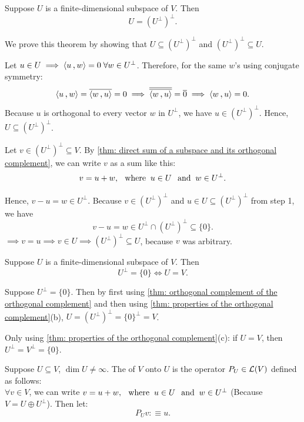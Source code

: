 \begin{thm}
  \label{thm: orthogonal complement of the orthogonal complement}
  Suppose $U$ is a finite-dimensional subspace of $V$. Then
  \[
    U = (U^{\bot})^{\bot}.
  \]
\end{thm}
\begin{prf}
  We prove this theorem by showing that $U \subseteq (U^{\bot})^{\bot}$ and $ (U^{\bot})^{\bot} \subseteq U$.

   Let $u \in U \implies \ip{u}{w}=0 \; \forall w \in U^{\bot}$.
  Therefore, for the same $w$'s using conjugate symmetry:
  \[
    \ip{u}{w}=\overline{\ip{w}{u}} =0 \implies
    \overline{\overline{\ip{w}{u}}} =\overline{0} \implies
    \ip{w}{u} = 0.
  \]
  Because $u$ is orthogonal to every vector
  $w$ in $U^{\bot}$, we have $u \in (U^{\bot})^{\bot}$. Hence, $U \subseteq (U^{\bot})^{\bot}$.

   Let $v \in (U^{\bot})^{\bot} \subseteq V.$ By \ref{thm: direct sum of a subspace and its orthogonal complement}, we can write $v$ as a sum like this:
  \[
    v = u + w, \;\;\, \text{where}\;\; u \in U \;\;\, \text{and}\;\; w \in U^{\bot}.
  \]

  Hence, $v-u=w \in U^\bot$. Because
  $v \in (U^\bot)^\bot$ and $u \in U \subseteq (U^\bot)^\bot$ from step 1, we have
  \[
    v-u=w \in U^\bot \cap (U^\bot)^\bot \subseteq \{0\}.
  \]
  $\implies v=u \implies v \in U \implies (U^\bot)^\bot \subseteq U$, because $v$ was arbitrary.
\end{prf}

\begin{thm}
  Suppose $U$ is a finite-dimensional subspace of $V$. Then
  \begin{equation}
    U^\bot = \{0\} \iff U=V.
  \end{equation}
\end{thm}
\begin{prf}
  \Rightarrowdirection Suppose $U^\bot=\{0\}.$ Then by first using \ref{thm: orthogonal complement of the orthogonal complement} and then using \ref{thm: properties of the orthogonal complement}(b), $U = (U^\bot)^\bot = \{0\}^\bot = V$.

  \Leftarrowdirection Only using \ref{thm: properties of the orthogonal complement}(c): if $U=V$, then $U^\bot = V^\bot = \{0\}$.
\end{prf}

\begin{mydef}
  Suppose $U \subseteq V$, $\dim U \neq \infty$. The  of $V$ onto $U$ is the operator $P_U \in \mathcal{L}(V)$ defined as follows: \\
  $\forall v \in V$, we can write $v = u + w, \;\;\, \text{where}\;\; u \in U \;\;\, \text{and}\;\; w \in U^\bot$ (Because $V=U \oplus U^\bot$). Then let:
  \begin{equation}
    P_U v :\equiv u.
  \end{equation}
\end{mydef}


